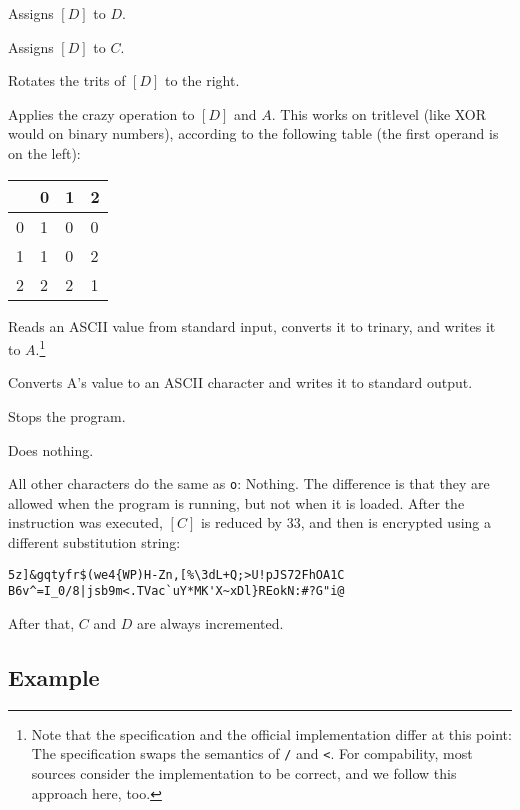 \begin{description}[labelsep=1em]
    \item[\texttt{j}] Assigns $[D]$ to $D$.
    \item[\texttt{i}] Assigns $[D]$ to $C$.
    \item[\texttt{*}] Rotates the trits of $[D]$ to the right.
    \item[\texttt{p}] Applies the crazy operation to $[D]$ and $A$. This works on tritlevel (like XOR would on binary numbers), according to the following table (the first operand is on the left):

     \begin{tabular}{l|lll}
     & 0 & 1 & 2\\
     \hline
     0 & 1 & 0 & 0\\
     1 & 1 & 0 & 2\\
     2 & 2 & 2 & 1
     \end{tabular}

    \item[\texttt{/}] Reads an ASCII value from standard input, converts it to trinary, and writes it to $A$.\footnote{Note that the specification and the official implementation differ at this point: The specification swaps the semantics of \texttt{/} and \texttt{<}. For compability, most sources consider the implementation to be correct, and we follow this approach here, too.}
    \item[\texttt{<}] Converts A's value to an ASCII character and writes it to standard output.
    \item[\texttt{v}] Stops the program.
    \item[\texttt{o}] Does nothing.
\end{description}

All other characters do the same as \texttt{o}: Nothing. The difference is that they are allowed when the program is running, but not when it is loaded. After the instruction was executed, $[C]$ is reduced by 33, and then is encrypted using a different substitution string:

\begin{lstlisting}[numbers=none,frame=none]
5z]&gqtyfr$(we4{WP)H-Zn,[%\3dL+Q;>U!pJS72FhOA1C
B6v^=I_0/8|jsb9m<.TVac`uY*MK'X~xDl}REokN:#?G"i@
\end{lstlisting}

After that, $C$ and $D$ are always incremented.

\subsection{Example}
\label{malbolge-example}

